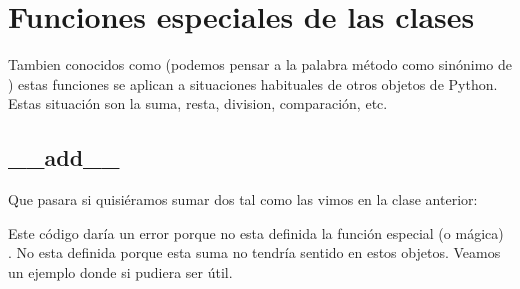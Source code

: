 \documentclass[a4paper,12pt,spanish]{sphinxmanual}
\begin{document}
\sphinxstepscope


\chapter{Funciones especiales de las clases}
\label{\detokenize{class-extras:funciones-especiales-de-las-clases}}\label{\detokenize{class-extras::doc}}
\sphinxAtStartPar
Tambien conocidos como  (podemos pensar a la palabra método como
sinónimo de ) estas funciones se aplican a situaciones habituales de otros
objetos de Python. Estas situación son la suma, resta, division, comparación, etc.


\section{\_\_add\_\_}
\label{\detokenize{class-extras:add}}
\sphinxAtStartPar
Que pasara si quisiéramos sumar dos  tal como las vimos en la clase anterior:

\begin{sphinxVerbatim}[commandchars=\\\{\}]
   
   

    
\end{sphinxVerbatim}

\sphinxAtStartPar
Este código daría un error porque no esta definida la función especial (o mágica) .
No esta definida porque esta suma no tendría sentido en estos objetos.
Veamos un ejemplo donde si pudiera ser útil.
\end{document}
